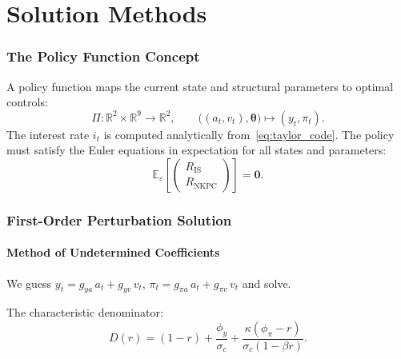\documentclass[11pt,a4paper]{article}
\theoremstyle{definition}
\newcommand{\E}{\mathbb{E}}
\newcommand{\R}{\mathbb{R}}
\newcommand{\btheta}{\boldsymbol{\theta}}
\begin{document}
	
	\part{Solution Methods}
	
	\section{The Policy Function Concept}
	\label{sec:policy}
	
	A policy function maps the current state and structural parameters to optimal controls:
	\begin{equation}\label{eq:policy_def}
		\Pi: \R^2 \times \R^9 \to \R^2, \qquad \bigl((a_t, v_t), \btheta\bigr) \mapsto (y_t, \pi_t).
	\end{equation}
	The interest rate $i_t$ is computed analytically from~\eqref{eq:taylor_code}.
	The policy must satisfy the Euler equations in expectation for all states and parameters:
	\begin{equation}\label{eq:euler_residual}
		\E_\varepsilon\!\left[\begin{pmatrix} R_{\mathrm{IS}} \\ R_{\mathrm{NKPC}} \end{pmatrix}\right] = \mathbf{0}.
	\end{equation}
	
	\section{First-Order Perturbation Solution}
	\label{sec:perturbation_1}
	
	\subsection{Method of Undetermined Coefficients}
	
	We guess $y_t = g_{ya}\, a_t + g_{yv}\, v_t$, $\pi_t = g_{\pi a}\, a_t + g_{\pi v}\, v_t$ and solve.
	
	The characteristic denominator:
	\begin{equation}\label{eq:denom}
		\boxed{D(r) = (1 - r) + \frac{\phi_y}{\sigma_c} + \frac{\kappa(\phi_\pi - r)}{\sigma_c(1 - \beta r)}.}
	\end{equation}
	
\end{document}
